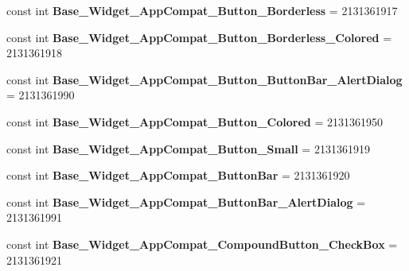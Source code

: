 \begin{DoxyCompactItemize}
const int {\bfseries Base\+\_\+\+Widget\+\_\+\+App\+Compat\+\_\+\+Button\+\_\+\+Borderless} = 2131361917
\item 
\mbox{\label{class_pinned_app_1_1_droid_1_1_resource_1_1_style_a62728f9a954ee5f2ffcd8d549b4af47c}} 
const int {\bfseries Base\+\_\+\+Widget\+\_\+\+App\+Compat\+\_\+\+Button\+\_\+\+Borderless\+\_\+\+Colored} = 2131361918
\item 
\mbox{\label{class_pinned_app_1_1_droid_1_1_resource_1_1_style_a20660833b3750911b8578951a5cfd467}} 
const int {\bfseries Base\+\_\+\+Widget\+\_\+\+App\+Compat\+\_\+\+Button\+\_\+\+Button\+Bar\+\_\+\+Alert\+Dialog} = 2131361990
\item 
\mbox{\label{class_pinned_app_1_1_droid_1_1_resource_1_1_style_a0eb6ec42ffb82a6845e07e6ca166d379}} 
const int {\bfseries Base\+\_\+\+Widget\+\_\+\+App\+Compat\+\_\+\+Button\+\_\+\+Colored} = 2131361950
\item 
\mbox{\label{class_pinned_app_1_1_droid_1_1_resource_1_1_style_ac4a85a207ce3f4680edecdc0a35588a7}} 
const int {\bfseries Base\+\_\+\+Widget\+\_\+\+App\+Compat\+\_\+\+Button\+\_\+\+Small} = 2131361919
\item 
\mbox{\label{class_pinned_app_1_1_droid_1_1_resource_1_1_style_a13a9511a8552c578d2513f4ce8b1fdd8}} 
const int {\bfseries Base\+\_\+\+Widget\+\_\+\+App\+Compat\+\_\+\+Button\+Bar} = 2131361920
\item 
\mbox{\label{class_pinned_app_1_1_droid_1_1_resource_1_1_style_ad1f60f615446adf864f784eef526e7a9}} 
const int {\bfseries Base\+\_\+\+Widget\+\_\+\+App\+Compat\+\_\+\+Button\+Bar\+\_\+\+Alert\+Dialog} = 2131361991
\item 
\mbox{\label{class_pinned_app_1_1_droid_1_1_resource_1_1_style_aa35adb2bf31ce7b6a331ccfadc6faa09}} 
const int {\bfseries Base\+\_\+\+Widget\+\_\+\+App\+Compat\+\_\+\+Compound\+Button\+\_\+\+Check\+Box} = 2131361921
\item 

\end{DoxyCompactItemize}
